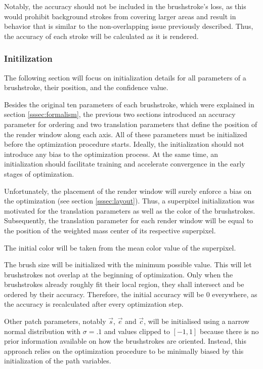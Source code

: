 Notably, the accuracy should not be included in the brushstroke's loss, as this would prohibit background strokes from covering larger areas and result in behavior that is similar to the non-overlapping issue previously described.
Thus, the accuracy of each stroke will be calculated as it is rendered.


\subsubsection{Initilization}

The following section will focus on initialization details for all parameters of a brushstroke, their position, and the confidence value.

Besides the original ten parameters of each brushstroke, which were explained in section \ref{sssec:formalism}, the previous two sections introduced an accuracy parameter for ordering and two translation parameters that define the position of the render window along each axis.
All of these parameters must be initialized before the optimization procedure starts.
Ideally, the initialization should not introduce any bias to the optimization process.
At the same time, an initialization should facilitate training and accelerate convergence in the early stages of optimization.

Unfortunately, the placement of the render window will surely enforce a bias on the optimization (see section \ref{sssec:layout}).
Thus, a superpixel initialization was motivated for the translation parameters as well as the color of the brushstrokes.
Subsequently, the translation parameter for each render window will be equal to the position of the weighted mass center of its respective superpixel.

The initial color will be taken from the mean color value of the superpixel.

The brush size will be initialized with the minimum possible value.
This will let brushstrokes not overlap at the beginning of optimization.
Only when the brushstrokes already roughly fit their local region, they shall intersect and be ordered by their accuracy.
Therefore, the initial accuracy will be 0 everywhere, as the accuracy is recalculated after every optimization step.

Other patch parameters, notably $\vec{s}$, $\vec{e}$ and $\vec{c}$, will be initialised using a narrow normal distribution with $\sigma = .1$ and values clipped to $[-1, 1]$ because there is no prior information available on how the brushstrokes are oriented.
Instead, this approach relies on the optimization procedure to be minimally biased by this initialization of the path variables.

